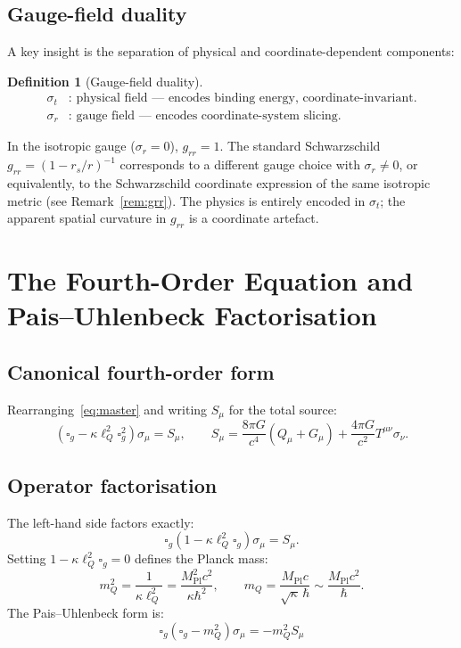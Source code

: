 \documentclass[11pt,a4paper]{article}
\theoremstyle{plain}
\theoremstyle{definition}
\newtheorem{definition}[theorem]{Definition}
\theoremstyle{remark}
\newcommand{\rs}{r_s}
\newcommand{\lQ}{\ell_Q}
\newcommand{\mQ}{m_Q}
\newcommand{\Mpl}{M_{\mathrm{Pl}}}
\newcommand{\boxg}{\square_g}
\begin{document}
\subsection{Gauge-field duality}

A key insight is the separation of physical and coordinate-dependent components:

\begin{definition}[Gauge-field duality]
\begin{align*}
  \sigma_t &: \text{ physical field --- encodes binding energy, coordinate-invariant.}\\
  \sigma_r &: \text{ gauge field --- encodes coordinate-system slicing.}
\end{align*}
\end{definition}

In the isotropic gauge ($\sigma_r = 0$), $g_{rr} = 1$.  The standard Schwarzschild
$g_{rr} = (1-\rs/r)^{-1}$ corresponds to a different gauge choice with $\sigma_r \ne 0$,
or equivalently, to the Schwarzschild coordinate expression of the same isotropic metric
(see Remark~\ref{rem:grr}).  The physics is entirely encoded in $\sigma_t$; the
apparent spatial curvature in $g_{rr}$ is a coordinate artefact.

\section{The Fourth-Order Equation and Pais--Uhlenbeck Factorisation}
\label{sec:PU}

\subsection{Canonical fourth-order form}

Rearranging~\eqref{eq:master} and writing $S_\mu$ for the total source:
\begin{equation}
  \boxed{(\boxg - \kappa\lQ^2\boxg^2)\sigma_\mu = S_\mu},
  \qquad
  S_\mu = \frac{8\pi G}{c^4}(Q_\mu + G_\mu) + \frac{4\pi G}{c^2}T^{\mu\nu}\sigma_\nu.
  \label{eq:fourth}
\end{equation}

\subsection{Operator factorisation}

The left-hand side factors exactly:
\begin{equation}
  \boxg(1 - \kappa\lQ^2\boxg)\sigma_\mu = S_\mu.
  \label{eq:factor}
\end{equation}
Setting $1 - \kappa\lQ^2\boxg = 0$ defines the Planck mass:
\begin{equation}
  \mQ^2 = \frac{1}{\kappa\lQ^2} = \frac{\Mpl^2 c^2}{\kappa\hbar^2},
  \qquad \mQ = \frac{\Mpl c}{\sqrt{\kappa}\,\hbar} \sim \frac{\Mpl c^2}{\hbar}.
  \label{eq:mQ}
\end{equation}
The Pais--Uhlenbeck form is:
\begin{equation}
  \boxed{\boxg(\boxg - \mQ^2)\sigma_\mu = -\mQ^2 S_\mu}
  \label{eq:PU}
\end{equation}
\end{document}
